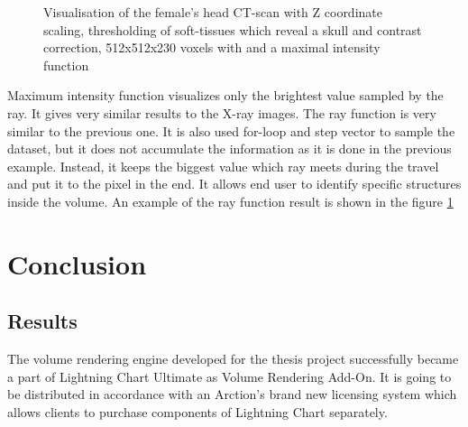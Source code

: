 \documentclass[twoside, english, 11pt]{report}
\begin{document}
\begin{figure}[!h]
\caption{Visualisation of the female's head CT-scan with Z coordinate scaling, thresholding of soft-tissues which reveal a skull and contrast correction, 512x512x230 voxels with and a maximal intensity function\label{fig:maxi}}
\end{figure}

Maximum intensity function visualizes only the brightest value sampled by the ray. It gives very similar results to the X-ray images. The ray function is very similar to the previous one. It is also used for-loop and step vector to sample the dataset, but it does not accumulate the information as it is done in the previous example. Instead, it keeps the biggest value which ray meets during the travel and put it to the pixel in the end. It allows end user to identify specific structures inside the volume. An example of the ray function result is shown in the figure \ref{fig:maxi}







\chapter{Conclusion}
\section{Results}
The volume rendering engine developed for the thesis project successfully became a part of Lightning Chart Ultimate as Volume Rendering Add-On. It is going to be distributed in accordance with an Arction's brand new licensing system which allows clients to purchase components of Lightning Chart separately.\\
\end{document}
